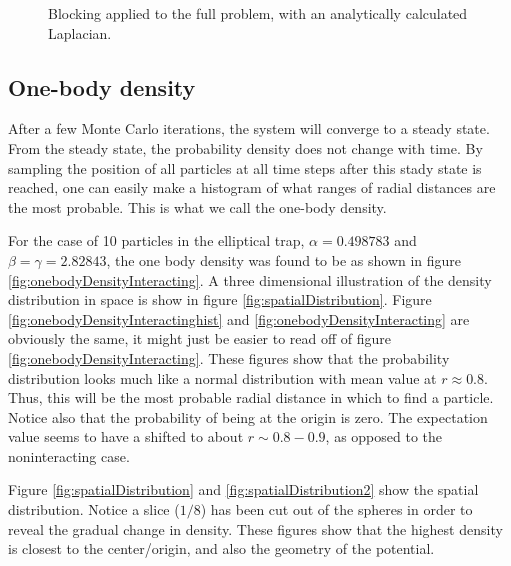 \documentclass[english, a4paper]{article}
\begin{document}
\begin{figure}[H]
	\caption{Blocking applied to the full problem, with an analytically calculated Laplacian.}
	\label{fig:blocking_full}
\end{figure}

\subsection{One-body density}
After a few Monte Carlo iterations, the system will converge to a steady state.
From the steady state, the probability density does not change with time. 
By sampling the position of all particles at all time steps after this stady state is 
reached, one can easily make a histogram of what ranges of radial distances are the most probable.
This is what we call the one-body density. 

For the case of 10 particles in the elliptical trap, $\alpha = 0.498783$ and $\beta = \gamma = 2.82843$, the one body density was found to be as shown in figure \ref{fig:onebodyDensityInteracting}.
A three dimensional illustration of the density distribution in space is show in figure \ref{fig:spatialDistribution}. 
Figure \ref{fig:onebodyDensityInteractinghist} and \ref{fig:onebodyDensityInteracting} are obviously the same, it might just be easier to read off of figure \ref{fig:onebodyDensityInteracting}. These figures show that the probability distribution looks much like a normal distribution with mean value at $r\approx0.8$. Thus, this will be the most probable radial distance in which to find a particle. Notice also that the probability of being at the origin is zero.
The expectation value seems to have a shifted to about $r\sim 0.8-0.9$, as opposed to the noninteracting case.

Figure \ref{fig:spatialDistribution} and \ref{fig:spatialDistribution2} show the spatial distribution. Notice a slice ($1/8$) has been cut out of the spheres in order to reveal the gradual change in density. These figures show that the highest density is closest to the center/origin, and also the geometry of the potential. 
\end{document}
